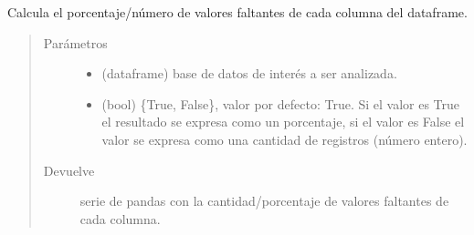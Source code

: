 \documentclass[letterpaper,10pt,openany,spanish]{sphinxmanual}
\begin{document}
\begin{fulllineitems}
\label{\detokenize{datos:datos.missing}}
Calcula el porcentaje/número de valores faltantes de cada columna del dataframe.
\begin{quote}\begin{description}
\item[{Parámetros}] \leavevmode\begin{itemize}
\item {} 
 \textendash{} (dataframe) base de datos de interés a ser analizada.

\item {} 
 \textendash{} (bool) \{True, False\}, valor por defecto: True. Si el valor es True el resultado se expresa como un porcentaje, si el valor es False el valor se expresa como una cantidad de registros (número entero).

\end{itemize}

\item[{Devuelve}] \leavevmode
serie de pandas con la cantidad/porcentaje de valores faltantes de cada columna.

\end{description}\end{quote}

\end{fulllineitems}

\end{document}
